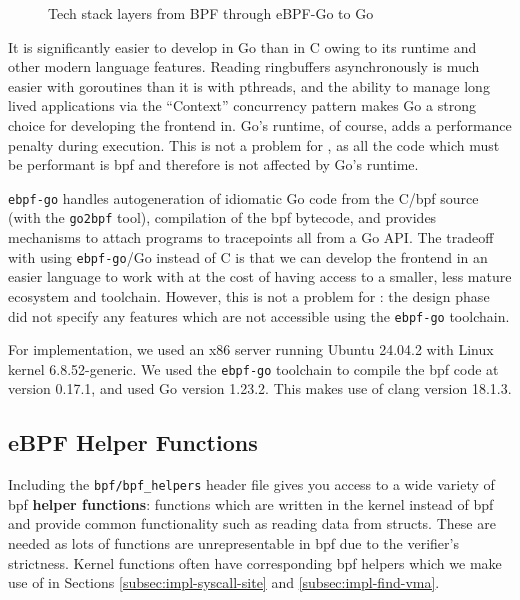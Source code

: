 \begin{figure}[ht]
  \centering
  \caption{Tech stack layers from BPF through eBPF-Go to Go}
  \label{fig:tech-stack}
\end{figure}

It is significantly easier to develop in Go than in C owing to its runtime and other 
modern language features. Reading ringbuffers asynchronously is much easier with 
goroutines than it is with pthreads, and the ability to manage long lived applications 
via the  ``Context'' concurrency pattern makes Go a strong choice for developing the 
frontend in. Go's runtime, of course, adds a performance penalty during execution. This  is not a problem for \afss, as all the code which must be performant is \ac{bpf} 
and therefore is not affected by Go's runtime. 

\texttt{ebpf-go} handles autogeneration of idiomatic Go code from the C/\ac{bpf}
source (with the \texttt{go2bpf} tool),
compilation of the \ac{bpf} bytecode, and provides mechanisms to attach programs
to tracepoints all from a Go API. The tradeoff with using
\texttt{ebpf-go}/Go instead of C is that we can develop the frontend in an
easier language to work with at the cost of having access to a smaller, less
mature ecosystem and toolchain. However, this is not a problem for \afss: the
design phase did not specify any features which are not accessible using the
\texttt{ebpf-go} toolchain. 

For implementation, we used an x86 server running Ubuntu 24.04.2 with Linux
kernel 6.8.52-generic. We used the \texttt{ebpf-go} toolchain to compile the
\ac{bpf} code at version 0.17.1, and used Go version 1.23.2. This makes use of
clang version 18.1.3.


\subsection{eBPF Helper Functions}

Including the \texttt{bpf/bpf\_helpers} header file gives you access to a wide
variety of \ac{bpf} \textbf{helper functions}: functions which are written in
the kernel instead of \ac{bpf} and provide common functionality such as reading
data from structs. These are needed as lots of functions are unrepresentable in 
\ac{bpf} due to the verifier's strictness. Kernel functions often have
corresponding \ac{bpf} helpers which we make use of in Sections
\ref{subsec:impl-syscall-site} and \ref{subsec:impl-find-vma}.

